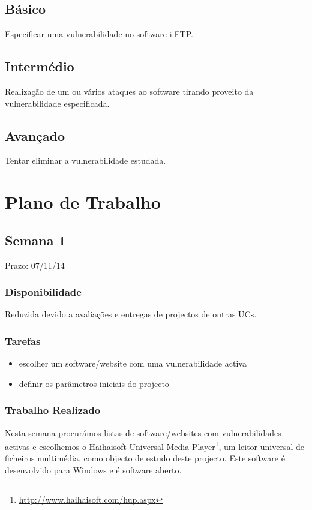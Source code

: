 \documentclass[a4paper]{article}
\begin{document}
\subsection*{Básico}
Especificar uma vulnerabilidade no software i.FTP.
\subsection*{Intermédio}
Realização de um ou vários ataques ao software tirando proveito da vulnerabilidade especificada.
\subsection*{Avançado}
Tentar eliminar a vulnerabilidade estudada.


\pagebreak
\section{Plano de Trabalho}

\subsection{Semana 1}
Prazo: 07/11/14
\subsubsection{Disponibilidade}
Reduzida devido a avaliações e entregas de projectos de outras UCs.

\subsubsection{Tarefas}
\begin{itemize}
\item escolher um software/website com uma vulnerabilidade activa
\item definir os parâmetros iniciais do projecto
\end{itemize}

\subsubsection{Trabalho Realizado}
Nesta semana procurámos listas de software/websites com vulnerabilidades activas e escolhemos o Haihaisoft Universal Media Player\footnote{\url{http://www.haihaisoft.com/hup.aspx}}, um leitor universal de ficheiros multimédia, como objecto de estudo deste projecto. Este software é desenvolvido para Windows e é software aberto.
\end{document}

